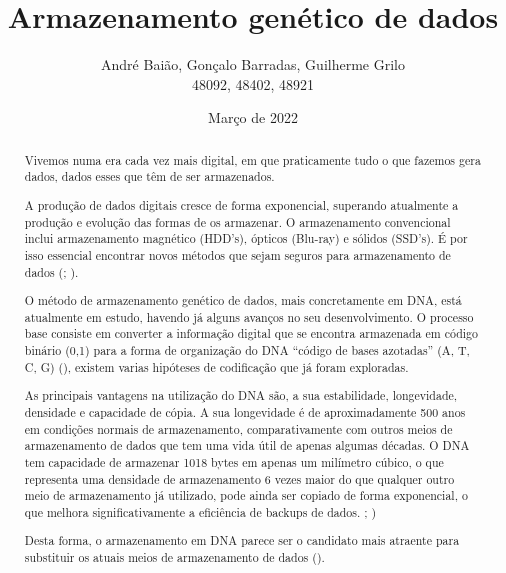 \documentclass{article}
\title{\textbf{Armazenamento genético de dados}}
\author{André Baião, Gonçalo Barradas, Guilherme Grilo\\
48092, 48402, 48921}
\date{Março de 2022}
\begin{document}
\maketitle
\begin{abstract}
Vivemos numa era cada vez mais digital, em que praticamente tudo o que fazemos gera dados, dados esses que têm de ser armazenados.

A produção de dados digitais cresce de forma exponencial, superando atualmente a produção e evolução das formas de os armazenar. O armazenamento convencional inclui armazenamento magnético (HDD's), ópticos (Blu-ray) e sólidos (SSD's). É por isso essencial encontrar novos métodos que sejam seguros para armazenamento de dados (\cite{Ceze2019}; \cite{STANLEY2020}).

O método de armazenamento genético de dados, mais concretamente em DNA, está atualmente em estudo, havendo já alguns avanços no seu desenvolvimento. O processo base consiste em converter a informação digital que se encontra armazenada em código binário (0,1) para a forma de organização do DNA “código de bases azotadas” (A, T, C, G) (\cite{YOO2021}), existem varias hipóteses de codificação que já foram exploradas.

As principais vantagens na utilização do DNA são, a sua estabilidade, longevidade, densidade e capacidade de cópia. A sua longevidade é de aproximadamente 500 anos em condições normais de armazenamento, comparativamente com outros meios de armazenamento de dados que tem uma vida útil de apenas algumas décadas. O DNA tem capacidade de armazenar 1018 bytes em apenas um milímetro cúbico, o que representa uma densidade de armazenamento 6 vezes maior do que qualquer outro meio de armazenamento já utilizado, pode ainda ser copiado de forma exponencial, o que melhora significativamente a eficiência de backups de dados. \cite{Cox2001}; \cite{STANLEY2020})

Desta forma, o armazenamento em DNA parece ser o candidato mais atraente para substituir os atuais meios de armazenamento de dados (\cite{YOO2021}).
\end{abstract}



\end{document}
